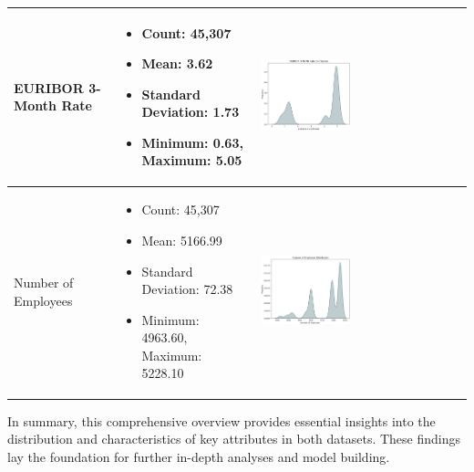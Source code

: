 \documentclass{article}
\begin{document}
\begin{longtable}{|p{}|p{}|p{}|}
    \hline
    EURIBOR 3-Month Rate & 
    \begin{itemize}
        \item Count: 45,307
        \item Mean: 3.62
        \item Standard Deviation: 1.73
        \item Minimum: 0.63, Maximum: 5.05
    \end{itemize} & 
    \includegraphics[width=0.45\textwidth]{data/bank_marketing/pic/Bank_Add_eur.png} \\
    \hline
    Number of Employees & 
    \begin{itemize}
        \item Count: 45,307
        \item Mean: 5166.99
        \item Standard Deviation: 72.38
        \item Minimum: 4963.60, Maximum: 5228.10
    \end{itemize} & 
    \includegraphics[width=0.45\textwidth]{data/bank_marketing/pic/Bank_Add_nr.png} \\
    \hline
\end{longtable}

In summary, this comprehensive overview provides essential insights into the distribution and characteristics of key attributes in both datasets. These findings lay the foundation for further in-depth analyses and model building.
\\ \\ \\ \\ \\
\end{document}
